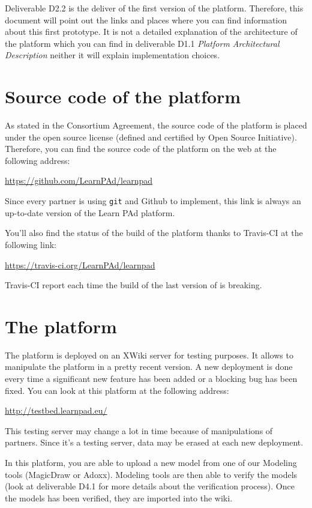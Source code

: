 \documentclass{learnpad}
\begin{document}
Deliverable D2.2 is the deliver of the first version of the \learnpad platform.
Therefore, this document will point out the links and places where you can find
information about this first prototype.  It is not a detailed explanation of the
architecture of the platform which you can find in deliverable D1.1
\emph{Platform Architectural Description} neither it will explain implementation
choices.

\section{Source code of the platform}

As stated in the Consortium Agreement, the source code of the platform is placed
under the open source license (defined and certified by Open Source Initiative).
Therefore, you can find the source code of the \learnpad platform on the web at
the following address:

\url{https://github.com/LearnPAd/learnpad}

Since every partner is using \texttt{git} and Github to implement, this link is
always an up-to-date version of the Learn PAd platform.

You'll also find the status of the build of the platform thanks to Travis-CI at
the following link:

\url{https://travis-ci.org/LearnPAd/learnpad}

Travis-CI report each time the build of the last version of \learnpad is
breaking.

\section{The platform}

The \learnpad platform is deployed on an XWiki server for testing purposes.  It
allows to manipulate the platform in a pretty recent version.  A new deployment
is done every time a significant new feature has been added or a blocking bug
has been fixed.  You can look at this platform at the following address:

\url{http://testbed.learnpad.eu/}

This testing server may change a lot in time because of manipulations of
partners.  Since it's a testing server, data may be erased at each new
deployment.

In this platform, you are able to upload a new model from one of our Modeling
tools (MagicDraw or Adoxx).  Modeling tools are then able to verify the models
(look at deliverable D4.1 for more details about the verification process).
Once the models has been verified, they are imported into the wiki.
\end{document}

